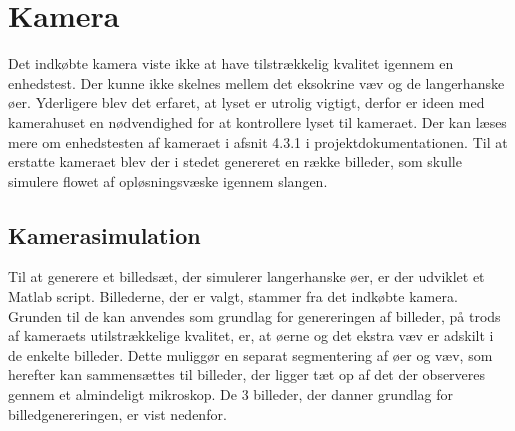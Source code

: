 \newpage
\section{Kamera}
Det indkøbte kamera viste ikke at have tilstrækkelig kvalitet igennem en enhedstest. Der kunne ikke skelnes mellem det eksokrine væv og de langerhanske øer. Yderligere blev det erfaret, at lyset er utrolig vigtigt, derfor er ideen med kamerahuset en nødvendighed for at kontrollere lyset til kameraet. Der kan læses mere om enhedstesten af kameraet i afsnit 4.3.1 i projektdokumentationen. Til at erstatte kameraet blev der i stedet genereret en række billeder, som skulle simulere flowet af opløsningsvæske igennem slangen.

\subsection{Kamerasimulation}
Til at generere et billedsæt, der simulerer langerhanske øer, er der udviklet et Matlab script. Billederne, der er valgt, stammer fra det indkøbte kamera. Grunden til de kan anvendes som grundlag for genereringen af billeder, på trods af kameraets utilstrækkelige kvalitet, er, at øerne og det ekstra væv er adskilt i de enkelte billeder. Dette muliggør en separat segmentering af øer og væv, som herefter kan sammensættes til billeder, der ligger tæt op af det der observeres gennem et almindeligt mikroskop. De 3 billeder, der danner grundlag for billedgenereringen, er vist nedenfor. 
